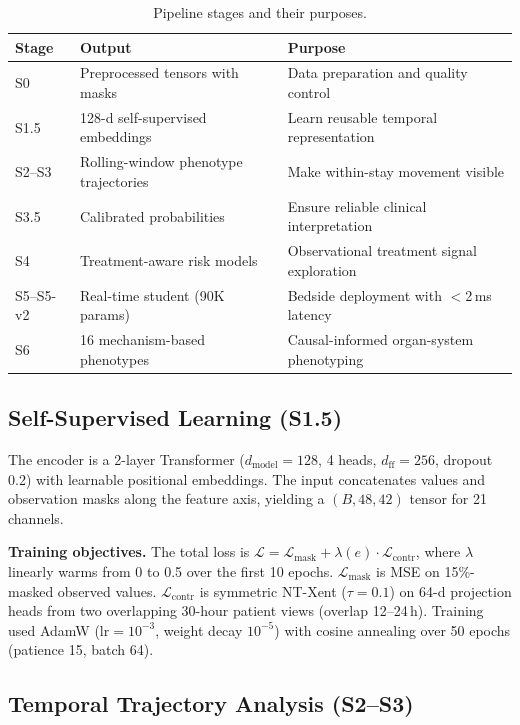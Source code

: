 \documentclass[conference,a4paper]{IEEEtran}
\begin{document}
\begin{table}[t]
\centering
\caption{Pipeline stages and their purposes.}
\label{tab:stages}
\small
\begin{tabularx}{\textwidth}{lXX}
\toprule
\textbf{Stage} & \textbf{Output} & \textbf{Purpose} \\
\midrule
S0 & Preprocessed tensors with masks & Data preparation and quality control \\
S1.5 & 128-d self-supervised embeddings & Learn reusable temporal representation \\
S2--S3 & Rolling-window phenotype trajectories & Make within-stay movement visible \\
S3.5 & Calibrated probabilities & Ensure reliable clinical interpretation \\
S4 & Treatment-aware risk models & Observational treatment signal exploration \\
S5--S5-v2 & Real-time student (90K params) & Bedside deployment with $<$2\,ms latency \\
S6 & 16 mechanism-based phenotypes & Causal-informed organ-system phenotyping \\
\bottomrule
\end{tabularx}
\end{table}

\subsection{Self-Supervised Learning (S1.5)}

The encoder is a 2-layer Transformer ($d_\text{model}{=}128$, 4 heads, $d_\text{ff}{=}256$, dropout 0.2) with learnable positional embeddings. The input concatenates values and observation masks along the feature axis, yielding a $(B, 48, 42)$ tensor for 21 channels.

\textbf{Training objectives.} The total loss is $\mathcal{L} = \mathcal{L}_\text{mask} + \lambda(e) \cdot \mathcal{L}_\text{contr}$, where $\lambda$ linearly warms from 0 to 0.5 over the first 10 epochs. $\mathcal{L}_\text{mask}$ is MSE on 15\%-masked observed values. $\mathcal{L}_\text{contr}$ is symmetric NT-Xent ($\tau{=}0.1$) on 64-d projection heads from two overlapping 30-hour patient views (overlap 12--24\,h). Training used AdamW ($\text{lr}{=}10^{-3}$, weight decay $10^{-5}$) with cosine annealing over 50 epochs (patience 15, batch 64).

\subsection{Temporal Trajectory Analysis (S2--S3)}
\end{document}
